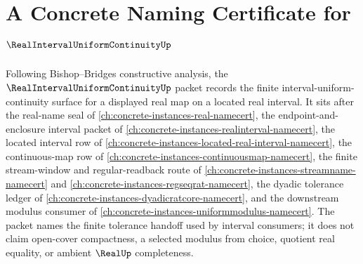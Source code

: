 \chapter{A Concrete Naming Certificate for $\RealIntervalUniformContinuityUp$}
\label{ch:concrete-instances-real-interval-uniform-continuity-namecert}

Following Bishop--Bridges constructive analysis, the $\RealIntervalUniformContinuityUp$ packet records the finite interval-uniform-continuity surface for a displayed real map on a located real interval. It sits after the real-name seal of \autoref{ch:concrete-instances-real-namecert}, the endpoint-and-enclosure interval packet of \autoref{ch:concrete-instances-realinterval-namecert}, the located interval row of \autoref{ch:concrete-instances-located-real-interval-namecert}, the continuous-map row of \autoref{ch:concrete-instances-continuousmap-namecert}, the finite stream-window and regular-readback route of \autoref{ch:concrete-instances-streamname-namecert} and \autoref{ch:concrete-instances-regseqrat-namecert}, the dyadic tolerance ledger of \autoref{ch:concrete-instances-dyadicratcore-namecert}, and the downstream modulus consumer of \autoref{ch:concrete-instances-uniformmodulus-namecert}. The packet names the finite tolerance handoff used by interval consumers; it does not claim open-cover compactness, a selected modulus from choice, quotient real equality, or ambient $\RealUp$ completeness.

